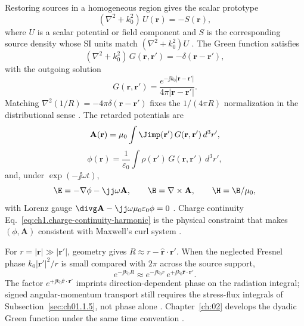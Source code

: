 Restoring sources in a homogeneous region gives the scalar prototype
\begin{equation}
\label{eq:ch1.inhomogeneous-helmholtz}
(\nabla^2+k_0^2)\,U(\mathbf{r})=-S(\mathbf{r}),
\end{equation}
where $U$ is a scalar potential or field component and $S$ is the corresponding source density whose SI units match $(\nabla^2+k_0^2)U$ \cite{stratton1941,jackson1999}. The Green function satisfies
\begin{equation}
\label{eq:ch1.green-defining}
(\nabla^2+k_0^2)\,G(\mathbf{r},\mathbf{r}')=-\delta(\mathbf{r}-\mathbf{r}'),
\end{equation}
with the outgoing solution
\begin{equation}
\label{eq:ch1.scalar-green-outgoing}
G(\mathbf{r},\mathbf{r}')
=
\frac{e^{-\jj k_0|\mathbf{r}-\mathbf{r}'|}}{4\pi|\mathbf{r}-\mathbf{r}'|}.
\end{equation}
Matching $\nabla^2(1/R)=-4\pi\delta(\mathbf{r}-\mathbf{r}')$ fixes the $1/(4\pi R)$ normalization in the distributional sense \cite{stratton1941,jackson1999}. The retarded potentials are
\begin{equation}
\label{eq:ch1.vector-potential-retarded}
\mathbf{A}(\mathbf{r})
=
\mu_0\int
\Jimp(\mathbf{r}')\,
G(\mathbf{r},\mathbf{r}')\,
d^3r',
\end{equation}
\begin{equation}
\label{eq:ch1.lorenz-scalar-potential-retarded}
\phi(\mathbf{r})
=
\frac{1}{\varepsilon_0}\int
\rho(\mathbf{r}')\,
G(\mathbf{r},\mathbf{r}')\,
d^3r',
\end{equation}
and, under $\exp(-\jj\omega t)$,
\begin{equation}
\label{eq:ch1.lorenz-field-reconstruction}
\E=-\nabla\phi-\jj\omega\mathbf{A},\qquad \B=\nabla\times\mathbf{A},\qquad \H=\B/\mu_0,
\end{equation}
with Lorenz gauge $\divg\mathbf{A}-\jj\omega\mu_0\varepsilon_0\phi=0$ \cite{stratton1941,jackson1999}. Charge continuity Eq.~\eqref{eq:ch1.charge-continuity-harmonic} is the physical constraint that makes $(\phi,\mathbf{A})$ consistent with Maxwell's curl system \cite{maxwell1873}.

For $r=|\mathbf{r}|\gg|\mathbf{r}'|$, geometry gives $R\approx r-\hat{\mathbf{r}}\cdot\mathbf{r}'$. When the neglected Fresnel phase $k_0|\mathbf{r}'|^2/r$ is small compared with $2\pi$ across the source support,
\begin{equation}
\label{eq:ch1.green-far-zone-phase}
e^{-\jj k_0 R}\approx e^{-\jj k_0 r}\,e^{+\jj k_0\hat{\mathbf{r}}\cdot\mathbf{r}'}.
\end{equation}
The factor $e^{+\jj k_0\hat{\mathbf{r}}\cdot\mathbf{r}'}$ imprints direction-dependent phase on the radiation integral; signed angular-momentum transport still requires the stress-flux integrals of Subsection~\ref{sec:ch01.1.5}, not phase alone \cite{stratton1941,jackson1999}. Chapter~\ref{ch:02} develops the dyadic Green function under the same time convention \cite{harrington2001,tai1994}.

